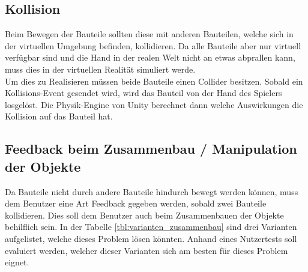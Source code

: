 \subsection{Kollision}
Beim Bewegen der Bauteile sollten diese mit anderen Bauteilen, welche sich in der virtuellen Umgebung befinden, kollidieren. Da alle Bauteile aber nur virtuell verfügbar sind und die Hand in der realen Welt nicht an etwas abprallen kann, muss dies in der virtuellen Realität simuliert werde. \\
Um dies zu Realisieren müssen beide Bauteile einen Collider besitzen. Sobald ein Kollisions-Event gesendet wird, wird das Bauteil von der Hand des Spielers losgelöst. Die Physik-Engine von Unity berechnet dann welche Auswirkungen die Kollision auf das Bauteil hat.
	
\subsection{Feedback beim Zusammenbau / Manipulation der Objekte}
Da Bauteile nicht durch andere Bauteile hindurch bewegt werden können, muss dem Benutzer eine Art Feedback gegeben werden, sobald zwei Bauteile kollidieren. Dies soll dem Benutzer auch beim Zusammenbauen der Objekte behilflich sein. In der Tabelle \ref{tbl:varianten_zusammenbau} sind drei Varianten aufgelistet, welche dieses Problem lösen könnten. Anhand eines Nutzertests soll evaluiert werden, welcher dieser Varianten sich am besten für dieses Problem eignet.
	
